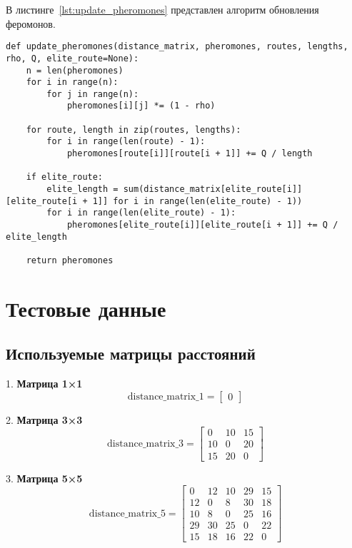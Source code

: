 В листинге~\ref{lst:update_pheromones} представлен алгоритм обновления феромонов.
\begin{center}
\begin{lstlisting}[caption={Алгоритм обновления феромонов}, label={lst:update_pheromones}]
def update_pheromones(distance_matrix, pheromones, routes, lengths, rho, Q, elite_route=None):
    n = len(pheromones)
    for i in range(n):
        for j in range(n):
            pheromones[i][j] *= (1 - rho)

    for route, length in zip(routes, lengths):
        for i in range(len(route) - 1):
            pheromones[route[i]][route[i + 1]] += Q / length

    if elite_route:
        elite_length = sum(distance_matrix[elite_route[i]][elite_route[i + 1]] for i in range(len(elite_route) - 1))
        for i in range(len(elite_route) - 1):
            pheromones[elite_route[i]][elite_route[i + 1]] += Q / elite_length

    return pheromones
\end{lstlisting}
\end{center}

\section{Тестовые данные}

\subsection*{Используемые матрицы расстояний}

1. \textbf{Матрица 1×1}
\[
\text{distance\_matrix\_1} = 
\begin{bmatrix}
0
\end{bmatrix}
\]

2. \textbf{Матрица 3×3}
\[
\text{distance\_matrix\_3} = 
\begin{bmatrix}
0 & 10 & 15 \\
10 & 0 & 20 \\
15 & 20 & 0
\end{bmatrix}
\]

3. \textbf{Матрица 5×5}
\[
\text{distance\_matrix\_5} = 
\begin{bmatrix}
0 & 12 & 10 & 29 & 15 \\
12 & 0 & 8 & 30 & 18 \\
10 & 8 & 0 & 25 & 16 \\
29 & 30 & 25 & 0 & 22 \\
15 & 18 & 16 & 22 & 0
\end{bmatrix}
\]

